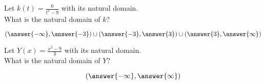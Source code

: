 \documentclass{ximera}
\begin{document}
\begin{exercise}
\begin{question}


Let $k(t) = \frac{6}{t^2 - 9}$ with its natural domain. \\

What is the natural domain of $k$?

\[
\left( \answer{-\infty}, \answer{-3}  \right) \cup \left( \answer{-3}, \answer{3}  \right) \cup \left( \answer{3}, \answer{\infty}  \right)
\]


\end{question}












\begin{question}


Let $Y(x) = \frac{x^2 - 9}{3}$ with its natural domain. \\

What is the natural domain of $Y$?

\[
\left( \answer{-\infty}, \answer{\infty}  \right)
\]


\end{question}













\end{exercise}
\end{document}
